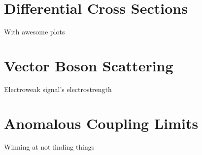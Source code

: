 \section{Differential Cross Sections}
With awesome plots



\section{Vector Boson Scattering}
Electroweak signal's electrostrength



\section{Anomalous Coupling Limits}
Winning at not finding things
